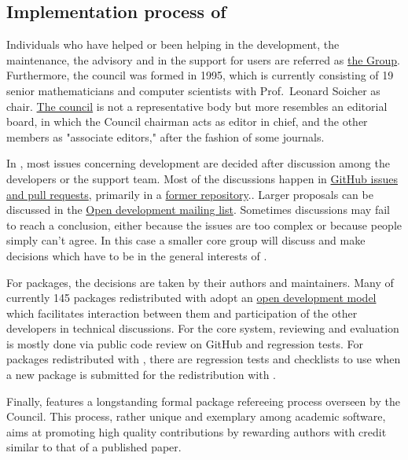 \documentclass{deliverablereport}
\begin{document}
\subsection{Implementation process of \GAP}

Individuals who have helped or been helping in the development, the
maintenance, the advisory and in the support for users are referred as
\href{https://www.gap-system.org/Contacts/People/people.html}{the \GAP
  Group}.  Furthermore, the \GAP council was formed in 1995, which is
currently consisting of 19 senior mathematicians and computer
scientists with Prof.~Leonard Soicher as
chair. \href{https://www.gap-system.org/Contacts/People/Council/council.html}{The
  \GAP council} is not a representative body but more resembles an
editorial board, in which the Council chairman acts as editor in
chief, and the other members as "associate editors," after
the fashion of some journals.

In \GAP, most issues concerning development are decided after
discussion among the developers or the support team. Most of the
discussions happen in \href{https://github.com/gap-system}{GitHub
  issues and pull requests}, primarily in a
\href{https://github.com/gap-system/gap}{former
  repository}.. Larger
proposals can be discussed in the
\href{http://mail.gap-system.org/mailman/listinfo/gap}{Open \GAP
  development mailing list}. Sometimes discussions may fail to reach a
conclusion, either because the issues are too complex or because
people simply can’t agree. In this case a smaller core group will
discuss and make decisions which have to be in the general interests
of \GAP.

For \GAP packages, the decisions are taken by their authors and
maintainers. Many of currently 145 packages redistributed with \GAP
adopt an \href{http://gap-packages.github.io/}{open development model}
which facilitates interaction between them and participation of the
other \GAP developers in technical discussions.  For the
core \GAP system, reviewing and evaluation is mostly done via public
code review on GitHub and regression tests. For \GAP packages
redistributed with \GAP, there are regression tests and checklists to
use when a new package is submitted for the redistribution with \GAP.

Finally, \GAP features a longstanding formal package refereeing process
overseen by the \GAP Council. This process, rather unique and exemplary
among academic software, aims at promoting high quality contributions
by rewarding authors with credit similar to that of a published paper.
\end{document}
